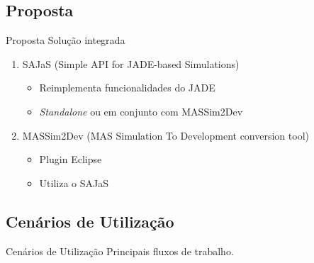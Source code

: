 
\subsection{Proposta}
\begin{frame}{Proposta}
	Solução integrada
	\begin{enumerate}
		\item SAJaS (Simple API for JADE-based Simulations)
		\begin{itemize}
			\item Reimplementa funcionalidades do JADE
			\item \emph{Standalone} ou em conjunto com MASSim2Dev
		\end{itemize}
		\item MASSim2Dev (MAS Simulation To Development conversion tool)
		\begin{itemize}
			\item Plugin Eclipse
			\item Utiliza o SAJaS
		\end{itemize}
	\end{enumerate}
\end{frame}

\subsection{Cenários de Utilização}
\begin{frame}{Cenários de Utilização}
	Principais fluxos de trabalho.


\begin{figure}[!h]
	\centering
\end{figure}


\end{frame}
